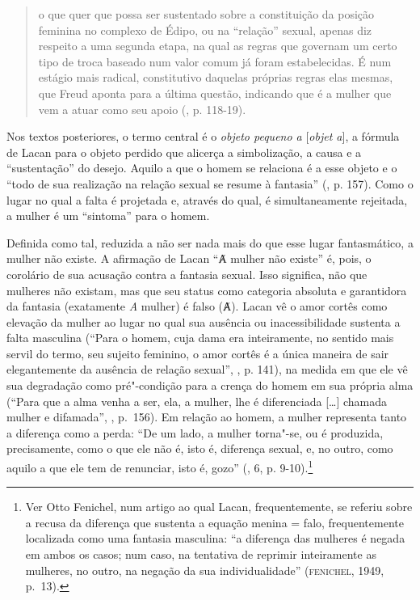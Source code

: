 \begin{quote}
o que quer que possa ser sustentado sobre a constituição da posição
feminina no complexo de Édipo, ou na ``relação'' sexual, apenas diz
respeito a uma segunda etapa, na qual as regras que governam um certo
tipo de troca baseado num valor comum já foram estabelecidas. É num
estágio mais radical, constitutivo daquelas próprias regras elas mesmas,
que Freud aponta para a última questão, indicando que é a mulher que vem
a atuar como seu apoio (, p. 118-19).
\end{quote}

Nos textos posteriores, o termo central é o \emph{objeto pequeno a}
{[}\emph{objet a}{]}, a fórmula de Lacan para o objeto perdido que
alicerça a simbolização, a causa e a ``sustentação'' do desejo. Aquilo a
que o homem se relaciona é a esse objeto e o ``todo de sua realização na
relação sexual se resume à fantasia'' (, p. 157). Como o lugar
no qual a falta é projetada e, através do qual, é simultaneamente
rejeitada, a mulher é um ``sintoma'' para o homem.

Definida como tal, reduzida a não ser nada mais do que esse lugar
fantasmático, a mulher não existe. A afirmação de Lacan ``Ⱥ mulher não
existe'' é, pois, o corolário de sua acusação contra a fantasia sexual.
Isso significa, não que mulheres não existam, mas que seu status como
categoria absoluta e garantidora da fantasia (exatamente \emph{A}
mulher) é falso (Ⱥ). Lacan vê o amor cortês como elevação da mulher ao
lugar no qual sua ausência ou inacessibilidade sustenta a falta
masculina (``Para o homem, cuja dama era inteiramente, no sentido mais
servil do termo, seu sujeito feminino, o amor cortês é a única maneira
de sair elegantemente da ausência de relação sexual'', , p.
141), na medida em que ele vê sua degradação como pré"-condição para a
crença do homem em sua própria alma (``Para que a alma venha a ser, ela,
a mulher, lhe é diferenciada {[}\ldots{}{]} chamada mulher e difamada'',
, p.~156). Em relação ao homem, a mulher representa tanto a
diferença como a perda: ``De um lado, a mulher torna"-se, ou é produzida,
precisamente, como o que ele não é, isto é, diferença sexual, e, no
outro, como aquilo a que ele tem de renunciar, isto é, gozo'' (,
6, p. 9-10).\footnote{Ver Otto Fenichel, num artigo ao qual Lacan, %
  frequentemente, se referiu sobre a recusa da diferença que sustenta a
  equação menina = falo, frequentemente localizada como uma fantasia
  masculina: ``a diferença das mulheres é negada em ambos os casos; num
      caso, na tentativa de reprimir inteiramente as mulheres, no outro, na
      negação da sua individualidade'' (\textsc{fenichel}, 1949, p.~13).}

